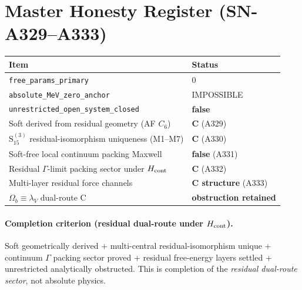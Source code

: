 
\section*{Master Honesty Register (SN-A329--A333)}
\begin{center}
\begin{tabular}{@{}p{7.6cm}p{5.0cm}@{}}
\toprule
\textbf{Item} & \textbf{Status} \\
\midrule
\texttt{free\_params\_primary} & $0$ \\
\texttt{absolute\_MeV\_zero\_anchor} & IMPOSSIBLE \\
\texttt{unrestricted\_open\_system\_closed} & \textbf{false} \\
Soft derived from residual geometry (AF $C_6$) & \textbf{C} (A329) \\
$\mathrm{S}_{15}^{(3)}$ residual-isomorphism uniqueness (M1--M7) & \textbf{C} (A330) \\
Soft-free local continuum packing Maxwell & \textbf{false} (A331) \\
Residual $\Gamma$-limit packing sector under $H_{\rm cont}$ & \textbf{C} (A332) \\
Multi-layer residual force channels & \textbf{C structure} (A333) \\
$\Omega_b\equiv\lambda_V$ dual-route C & \textbf{obstruction retained} \\
\bottomrule
\end{tabular}
\end{center}

\paragraph{Completion criterion (residual dual-route under $H_{\rm cont}$).}
Soft geometrically derived + multi-central residual-isomorphism unique + continuum $\Gamma$ packing sector proved + residual free-energy layers settled + unrestricted analytically obstructed.
This is completion of the \emph{residual dual-route sector}, not absolute physics.

